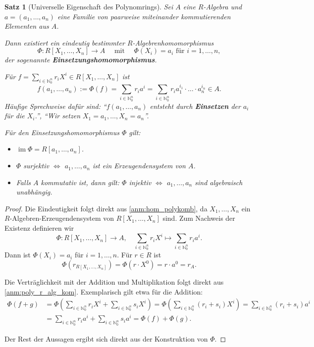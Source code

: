 \documentclass[a4paper, twoside, 11pt, ngerman]{report}
\newcommand{\NN}{\mathds N}
\DeclareMathOperator{\image}{im}
\theoremstyle{definistyle}
\newtheorem{satz}{Satz}[section]
\theoremstyle{remark}
\newcommand{\defn}[1]{\textit{\bfseries #1}}
\begin{document}
\begin{satz}[Universelle Eigenschaft des Polynomrings]\label{satz:ue_polynomrings}
Sei $A$ eine $R$-Algebra und $a = (a_1, \ldots, a_n)$ eine Familie von paarweise miteinander kommutierenden Elementen aus $A$. 

Dann existiert ein eindeutig bestimmter $R$-Algebrenhomomorphismus 
\[
\Phi \colon R[X_1, \ldots, X_n] \to A \quad \text{ mit } \quad \Phi(X_i) = a_i \text{ für }
i = 1, \ldots, n,
\]
der sogenannte \defn{Einsetzungshomomorphismus}.

Für $f = \sum_{i \in \NN_0^n} r_i X^i \in R[X_1, \ldots, X_n]$ ist
\[
f(a_1,\ldots,a_n):=\Phi(f) = \sum_{i \in \NN_0^n} r_i a^i = \sum_{i \in \NN_0^n} r_i a_1^{i_1} \cdot \ldots \cdot a_n^{i_n} \in A.
\]
Häufige Sprechweise dafür sind: "`$f(a_1, \ldots, a_n)$ entsteht durch \defn{Einsetzen} der $a_i$ für die $X_i$."', "`Wir setzen $X_1=a_1,\ldots,X_n=a_n$"'.

Für den Einsetzungshomomorphismus $\Phi$ gilt:
\begin{itemize}
    \item $\image\Phi=R[a_1,\ldots,a_n]$.
    \item $\Phi$ surjektiv $\iff $ $a_1, \ldots, a_n$ ist ein Erzeugendensystem von $A$.
    \item Falls $A$ kommutativ ist, dann gilt: $\Phi$ injektiv $\iff$ $a_1, \ldots, a_n$ sind algebraisch unabhängig.
\end{itemize}
\end{satz}
\begin{proof}
Die Eindeutigkeit folgt direkt aus \ref{anm:hom_polykomb}, da $X_1, \ldots, X_n$ ein $R$-Algebren-Erzeugendensystem von $R[X_1,\ldots,X_n]$ sind. Zum Nachweis der Existenz definieren wir
\[
\Phi \colon R[X_1, \ldots, X_n] \to A, \quad \sum_{i \in \NN_0^n} r_i X^i \mapsto \sum_{i \in \NN_0^n} r_i a^i.
\]
Dann ist $\Phi(X_i) = a_i$ für $i = 1, \ldots, n$.
Für $r \in R$ ist
\[
\Phi(r_{R[X_1, \ldots, X_n]}) = \Phi(r \cdot X^0) = r \cdot a^0 = r_A.
\]

Die Verträglichkeit mit der Addition und Multiplikation folgt direkt aus \ref{anm:poly_r_alg_kom}. Exemplarisch gilt etwa für die Addition:
\begin{align*}
\Phi(f + g) &= \Phi\left(\sum_{i \in \NN_0^n} r_i X^i + \sum_{i \in \NN_0^n} s_i X^i\right) = \Phi\left(\sum_{i \in \NN_0^n} (r_i + s_i) X^i\right) = \sum_{i \in \NN_0^n} (r_i + s_i) a^i \\
&= \sum_{i \in \NN_0^n} r_i a^i + \sum_{i \in \NN_0^n} s_i a^i = \Phi(f) + \Phi(g).
\end{align*}

Der Rest der Aussagen ergibt sich direkt aus der Konstruktion von $\Phi$.
\end{proof}
\end{document}

